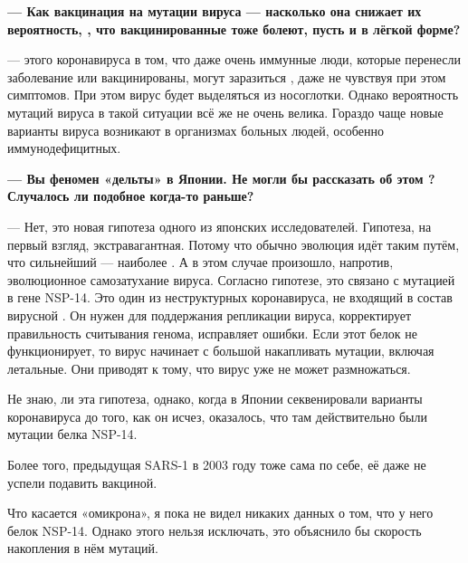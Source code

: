 {\bf --- Как вакцинация  на мутации вируса --- насколько она снижает их вероятность, , что вакцинированные тоже болеют, пусть и в лёгкой форме?}

---  этого коронавируса в том, что даже очень иммунные люди, которые перенесли заболевание или вакцинированы, могут заразиться , даже не чувствуя при этом симптомов. При этом вирус будет выделяться из носоглотки. Однако вероятность мутаций вируса в такой ситуации всё же не очень велика. Гораздо чаще новые варианты вируса возникают в организмах больных людей, особенно иммунодефицитных.

{\bf --- Вы  феномен  «дельты» в Японии. Не могли бы рассказать об этом ? Случалось ли подобное когда-то раньше?}

--- Нет, это новая гипотеза одного из японских исследователей. Гипотеза, на первый взгляд, экстравагантная. Потому что обычно эволюция идёт таким путём, что  сильнейший --- наиболее . А в этом случае произошло, напротив, эволюционное самозатухание вируса. Согласно гипотезе, это связано с мутацией в гене NSP-14. Это один из неструктурных  коронавируса, не входящий в состав вирусной . Он нужен для поддержания репликации вируса, корректирует правильность считывания генома, исправляет ошибки. Если этот белок не функционирует, то вирус начинает с большой  накапливать мутации, включая летальные. Они приводят к тому, что вирус уже не может размножаться.

Не знаю,  ли эта гипотеза, однако, когда в Японии секвенировали варианты коронавируса до того, как он исчез, оказалось, что там действительно были мутации белка NSP-14.

Более того, предыдущая  SARS-1 в 2003 году тоже  сама по себе, её даже не успели подавить вакциной.

Что касается «омикрона», я пока не видел никаких данных о том, что у него  белок NSP-14. Однако этого нельзя исключать, это объяснило бы скорость накопления в нём мутаций.

